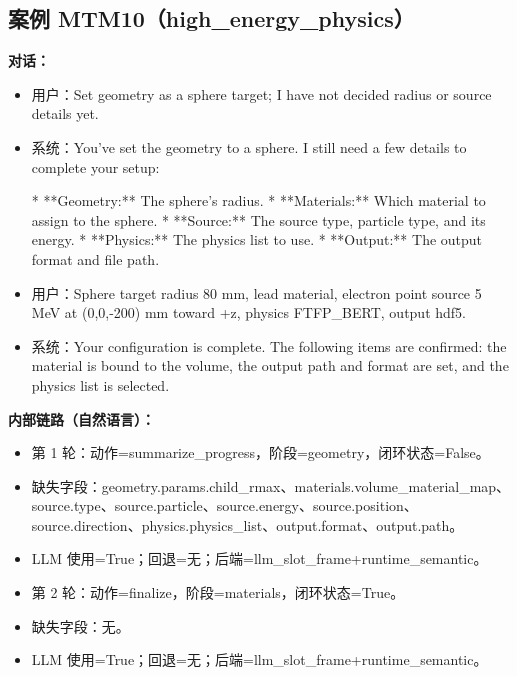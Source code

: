 \documentclass[11pt]{ctexart}
\begin{document}
\subsection{案例 MTM10（high\_energy\_physics）}
\textbf{对话：}
\begin{itemize}
\item 用户：Set geometry as a sphere target; I have not decided radius or source details yet.
\item 系统：You've set the geometry to a sphere. I still need a few details to complete your setup:

*   **Geometry:** The sphere's radius.
*   **Materials:** Which material to assign to the sphere.
*   **Source:** The source type, particle type, and its energy.
*   **Physics:** The physics list to use.
*   **Output:** The output format and file path.
\item 用户：Sphere target radius 80 mm, lead material, electron point source 5 MeV at (0,0,-200) mm toward +z, physics FTFP\_BERT, output hdf5.
\item 系统：Your configuration is complete. The following items are confirmed: the material is bound to the volume, the output path and format are set, and the physics list is selected.
\end{itemize}
\textbf{内部链路（自然语言）：}
\begin{itemize}
\item 第 1 轮：动作=summarize\_progress，阶段=geometry，闭环状态=False。
\item 缺失字段：geometry.params.child\_rmax、materials.volume\_material\_map、source.type、source.particle、source.energy、source.position、source.direction、physics.physics\_list、output.format、output.path。
\item LLM 使用=True；回退=无；后端=llm\_slot\_frame+runtime\_semantic。
\item 第 2 轮：动作=finalize，阶段=materials，闭环状态=True。
\item 缺失字段：无。
\item LLM 使用=True；回退=无；后端=llm\_slot\_frame+runtime\_semantic。
\end{itemize}
\end{document}
